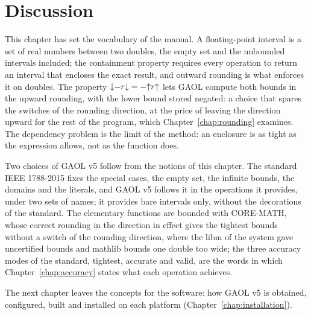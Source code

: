 \section{Discussion}\label{sec:concepts-discussion}

This chapter has set the vocabulary of the manual. A floating-point
interval is a set of real numbers between two doubles, the empty set and
the unbounded intervals included; the containment property requires every
operation to return an interval that encloses the exact result, and
outward rounding is what enforces it on doubles. The property
$\mathopen{\downarrow}-r\mathclose{\downarrow}=-\mathopen{\uparrow}r\mathclose{\uparrow}$ lets GAOL compute both bounds in the upward
rounding, with the lower bound stored negated: a choice that spares the
switches of the rounding direction, at the price of leaving the direction
upward for the rest of the program, which Chapter~\ref{chap:rounding}
examines. The dependency problem is the limit of the method: an enclosure
is as tight as the expression allows, not as the function does.

\medskip
Two choices of GAOL v5 follow from the notions of this chapter. The
standard IEEE 1788-2015 fixes the special cases, the empty set, the
infinite bounds, the domains and the literals, and GAOL v5 follows it in
the operations it provides, under two sets of names; it provides bare
intervals only, without the decorations of the standard. The elementary
functions are bounded with CORE-MATH, whose correct rounding in the
direction in effect gives the tightest bounds without a switch of the
rounding direction, where the libm of the system gave uncertified bounds
and mathlib bounds one double too wide; the three accuracy modes of the
standard, tightest, accurate and valid, are the words in which
Chapter~\ref{chap:accuracy} states what each operation achieves.

\medskip
The next chapter leaves the concepts for the software: how GAOL v5 is
obtained, configured, built and installed on each platform
(Chapter~\ref{chap:installation}).
